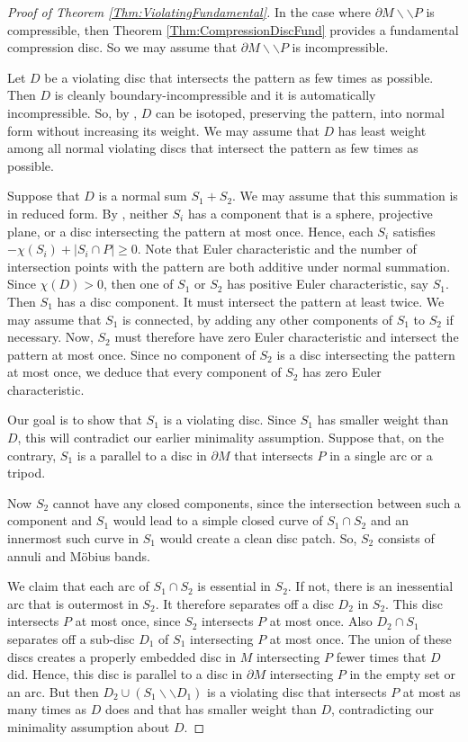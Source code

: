 \documentclass[oneside]{amsart}
\numberwithin{equation}{section}
\theoremstyle{plain}
\theoremstyle{definition}
\newcommand{\cut}{\backslash\backslash}
\begin{document}
\begin{proof}[Proof of Theorem \ref{Thm:ViolatingFundamental}]
In the case where $\partial M \cut P$ is compressible, then Theorem \ref{Thm:CompressionDiscFund} provides
a fundamental compression disc. So we may assume that $\partial M \cut P$ is
incompressible. 

Let $D$ be a violating disc that intersects the pattern as few times as possible. Then $D$ is
cleanly boundary-incompressible and it is automatically incompressible.
So, by \cite[Corollary 3.3.25]{Matveev}, $D$ can be isotoped,
preserving the pattern, into normal form without increasing its weight.
We may assume that $D$ has least weight among all normal violating discs that
intersect the pattern as few times as possible.

Suppose that $D$ is a normal sum $S_1 + S_2$. We may assume that
this summation is in reduced form. By \cite[Theorem 4.1.36]{Matveev},
neither $S_i$ has a component that is a sphere, projective plane, or a disc intersecting the pattern at most once.
Hence, each $S_i$ satisfies $-\chi(S_i) + |S_i \cap P| \geq 0$. Note that Euler
characteristic and the number of intersection points with the pattern are both additive
under normal summation.
Since $\chi(D) > 0$, then one of $S_1$ or $S_2$ has positive Euler characteristic, say $S_1$.
Then $S_1$ has a disc component. It must intersect the pattern at least twice. We may assume
that $S_1$ is connected, by adding any other components of $S_1$ to $S_2$ if necessary.
Now, $S_2$ must therefore have zero Euler characteristic and intersect the pattern at most once.
Since no component of $S_2$ is a disc intersecting the pattern at most once, we deduce that
every component of $S_2$ has zero Euler characteristic.

Our goal is to show that $S_1$ is a violating disc. Since $S_1$ has smaller weight than $D$,
this will contradict our earlier minimality assumption. Suppose that, on the contrary,
$S_1$ is a parallel to a disc in $\partial M$ that intersects $P$ in a single arc or a tripod.

Now $S_2$ cannot have any closed components, since the intersection between such a component
and $S_1$ would lead to a simple closed curve of $S_1 \cap S_2$ and an innermost
such curve in $S_1$ would create a clean disc patch. So, $S_2$ consists of annuli
and M\"obius bands.

We claim that each arc of $S_1 \cap S_2$ is essential in $S_2$. If not, there is an 
inessential arc that is outermost in $S_2$. It therefore separates off a disc $D_2$ in $S_2$.
This disc intersects $P$ at most once, since $S_2$ intersects $P$ at most once.
Also $D_2 \cap S_1$ separates off a sub-disc $D_1$ of $S_1$ intersecting $P$ at most once.
The union of these discs creates a properly embedded disc in $M$ intersecting
$P$ fewer times that $D$ did. Hence, this disc is parallel to a disc in $\partial M$
intersecting $P$ in the empty set or an arc. But then $D_2 \cup (S_1 \cut D_1)$ is
a violating disc that intersects $P$ at most as many times as $D$ does and that
has smaller weight than $D$, contradicting our minimality assumption
about $D$.


\end{proof}
\end{document}
